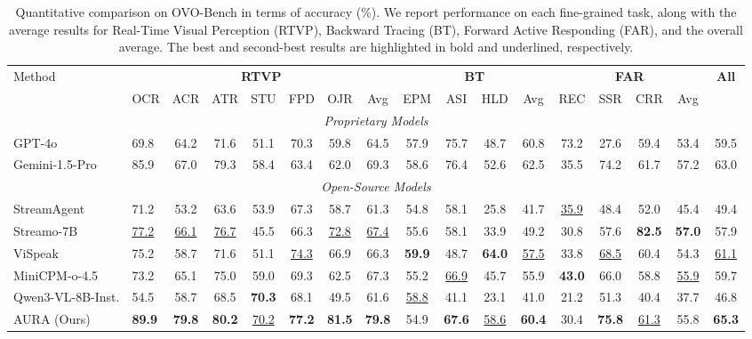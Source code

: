 \begin{table}[t]
  \renewcommand{\arraystretch}{1.3}
  \caption{Quantitative comparison on OVO-Bench in terms of accuracy (\%). We report performance on each fine-grained task, along with the average results for Real-Time Visual Perception (RTVP), Backward Tracing (BT), Forward Active Responding (FAR), and the overall average. The best and second-best results are highlighted in bold and underlined, respectively.}
  \label{tab:ovobench}
  \centering
  \setlength{\tabcolsep}{3.5pt}%
  \footnotesize
  \begin{tabular}{l|l*{15}{c}}
    \toprule
    \multirow{2}{*}{Method} & \multicolumn{7}{c}{\textbf{RTVP}} & \multicolumn{4}{c}{\textbf{BT}} & \multicolumn{4}{c}{\textbf{FAR}} & \multirow{2}{*}{\textbf{All}} \\
    \cmidrule(lr){2-8}
    \cmidrule(lr){9-12}
    \cmidrule(lr){13-16}
    & OCR & ACR & ATR & STU & FPD & OJR & Avg & EPM & ASI & HLD & Avg & REC & SSR & CRR & Avg & \\
    \midrule
    \multicolumn{17}{c}{\textit{Proprietary Models}} \\
    \midrule
    GPT-4o & 69.8 & 64.2 & 71.6 & 51.1 & 70.3 & 59.8 & 64.5 & 57.9 & 75.7 & 48.7 & 60.8 & 73.2 & 27.6 & 59.4 & 53.4 & 59.5 \\
    Gemini-1.5-Pro & 85.9 & 67.0 & 79.3 & 58.4 & 63.4 & 62.0 & 69.3 & 58.6 & 76.4 & 52.6 & 62.5 & 35.5 & 74.2 & 61.7 & 57.2 & 63.0 \\
    \midrule
    \multicolumn{17}{c}{\textit{Open-Source Models}} \\
    \midrule
    StreamAgent & 71.2 & 53.2 & 63.6 & 53.9 & 67.3 & 58.7 & 61.3 & 54.8 & 58.1 & 25.8 & 41.7 & \underline{35.9} & 48.4 & 52.0 & 45.4 & 49.4 \\
    Streamo-7B & \underline{77.2} & \underline{66.1} & \underline{76.7} & 45.5 & 66.3 & \underline{72.8} & \underline{67.4} & 55.6 & 58.1 & 33.9 & 49.2 & 30.8 & 57.6 & \textbf{82.5} & \textbf{57.0} & 57.9 \\
    ViSpeak & 75.2 & 58.7 & 71.6 & 51.1 & \underline{74.3} & 66.9 & 66.3 & \textbf{59.9} & 48.7 & \textbf{64.0} & \underline{57.5} & 33.8 & \underline{68.5} & 60.4 & 54.3 & \underline{61.1} \\
    MiniCPM-o-4.5 & 73.2 & 65.1 & 75.0 & 59.0 & 69.3 & 62.5 & 67.3 & 55.2 & \underline{66.9} & 45.7 & 55.9 & \textbf{43.0} & 66.0 & 58.8 & \underline{55.9} & 59.7 \\
    Qwen3-VL-8B-Inst. & 54.5 & 58.7 & 68.5 & \textbf{70.3} & 68.1 & 49.5 & 61.6 & \underline{58.8} & 41.1 & 23.1 & 41.0 & 21.2 & 51.3 & 40.4 & 37.7 & 46.8 \\
    AURA (Ours) & \textbf{89.9} & \textbf{79.8} & \textbf{80.2} & \underline{70.2} & \textbf{77.2} & \textbf{81.5} & \textbf{79.8} & 54.9 & \textbf{67.6} & \underline{58.6} & \textbf{60.4} & 30.4 & \textbf{75.8} & \underline{61.3} & 55.8 & \textbf{65.3} \\
    \bottomrule
  \end{tabular}%
\end{table}

